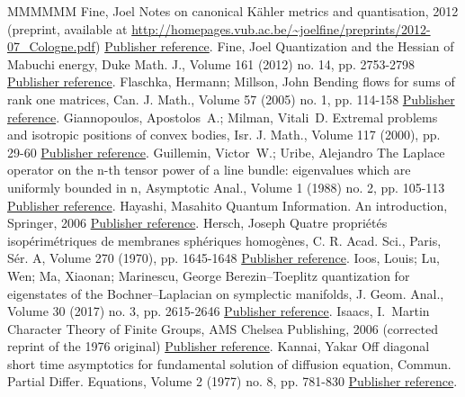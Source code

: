 \begin{thebibliography}{MMMMMM}
 Fine, Joel Notes on canonical Kähler metrics and quantisation, 2012 (preprint, available at \url{http://homepages.vub.ac.be/~joelfine/preprints/2012-07_Cologne.pdf}) \href{https://ahl.centre-mersenne.org/item/AHL_2020__3__1343_0/#Fine-lectures}{Publisher reference}.
 Fine, Joel Quantization and the Hessian of Mabuchi energy, Duke Math. J., Volume 161 (2012) no. 14, pp. 2753-2798 \href{https://ahl.centre-mersenne.org/item/AHL_2020__3__1343_0/#Fin12}{Publisher reference}.
 Flaschka, Hermann; Millson, John Bending flows for sums of rank one matrices, Can. J. Math., Volume 57 (2005) no. 1, pp. 114-158 \href{https://ahl.centre-mersenne.org/item/AHL_2020__3__1343_0/#FM}{Publisher reference}.
 Giannopoulos, Apostolos A.; Milman, Vitali D. Extremal problems and isotropic positions of convex bodies, Isr. J. Math., Volume 117 (2000), pp. 29-60 \href{https://ahl.centre-mersenne.org/item/AHL_2020__3__1343_0/#GM}{Publisher reference}.
 Guillemin, Victor W.; Uribe, Alejandro The Laplace operator on the n-th tensor power of a line bundle: eigenvalues which are uniformly bounded in n, Asymptotic Anal., Volume 1 (1988) no. 2, pp. 105-113 \href{https://ahl.centre-mersenne.org/item/AHL_2020__3__1343_0/#GU88}{Publisher reference}.
 Hayashi, Masahito Quantum Information. An introduction, Springer, 2006 \href{https://ahl.centre-mersenne.org/item/AHL_2020__3__1343_0/#Hayashi}{Publisher reference}.
 Hersch, Joseph Quatre propriétés isopérimétriques de membranes sphériques homogènes, C. R. Acad. Sci., Paris, Sér. A, Volume 270 (1970), pp. 1645-1648 \href{https://ahl.centre-mersenne.org/item/AHL_2020__3__1343_0/#Her70}{Publisher reference}.
 Ioos, Louis; Lu, Wen; Ma, Xiaonan; Marinescu, George Berezin–Toeplitz quantization for eigenstates of the Bochner–Laplacian on symplectic manifolds, J. Geom. Anal., Volume 30 (2017) no. 3, pp. 2615-2646 \href{https://ahl.centre-mersenne.org/item/AHL_2020__3__1343_0/#ILMM17}{Publisher reference}.
 Isaacs, I. Martin Character Theory of Finite Groups, AMS Chelsea Publishing, 2006 (corrected reprint of the 1976 original) \href{https://ahl.centre-mersenne.org/item/AHL_2020__3__1343_0/#Isaacs}{Publisher reference}.
 Kannai, Yakar Off diagonal short time asymptotics for fundamental solution of diffusion equation, Commun. Partial Differ. Equations, Volume 2 (1977) no. 8, pp. 781-830 \href{https://ahl.centre-mersenne.org/item/AHL_2020__3__1343_0/#Kannai}{Publisher reference}.

\end{thebibliography}
